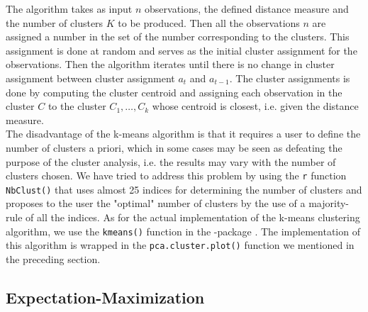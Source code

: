 \documentclass[../thesis.tex]{subfiles}
\begin{document}
\noindent The algorithm takes as input $n$ observations, the defined distance measure and the number of clusters $K$ to be produced. Then all the observations $n$ are assigned a number in the set of the number corresponding to the clusters. This assignment is done at random and serves as the initial cluster assignment for the observations. Then the algorithm iterates until there is no change in cluster assignment between cluster assignment $a_t$ and $a_{t-1}$. The cluster assignments is done by computing the cluster centroid and assigning each observation in the cluster $C$ to the cluster $C_1, \hdots, C_k$ whose centroid is closest, i.e. given the distance measure. \\
\indent The disadvantage of the k-means algorithm is that it requires a user to define the number  of clusters a priori, which in some cases may be seen as defeating the purpose of the cluster analysis, i.e. the results may vary with the number of clusters chosen. We have tried to address this problem by using the \texttt{r} function \texttt{NbClust()} \citep{nbclust} that uses almost 25 indices for determining the number of clusters and proposes to the user the "optimal" number of clusters by the use of a majority-rule of all the indices. As for the actual implementation of the k-means clustering algorithm, we use the \texttt{kmeans()} function in the -package \citep{stats}. The implementation of this algorithm is wrapped in the \texttt{pca.cluster.plot()} function we mentioned in the preceding section.

\vspace*{-0,25cm}\subsection{Expectation-Maximization}
\label{subsec:em}
\end{document}
